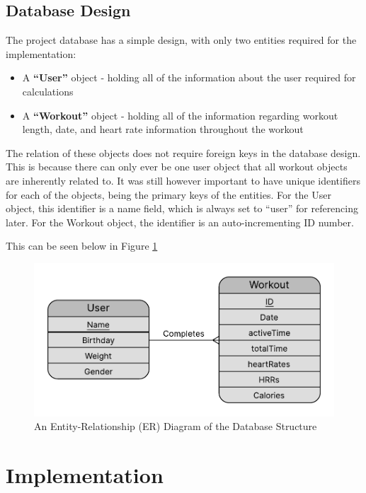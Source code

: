 \documentclass{l4proj}
\begin{document}
\section{Database Design}
\label{sec:databasedesign}

The project database has a simple design, with only two entities required for the implementation:

\begin{itemize}
    \item A \textbf{“User”} object - holding all of the information about the user required for calculations
    \item A \textbf{“Workout”} object - holding all of the information regarding workout length, date, and heart rate information throughout the workout
\end{itemize}

The relation of these objects does not require foreign keys in the database design. This is because there can only ever be one user object that all workout objects are inherently related to. It was still however important to have unique identifiers for each of the objects, being the primary keys of the entities. For the User object, this identifier is a name field, which is always set to “user” for referencing later. For the Workout object, the identifier is an auto-incrementing ID number.

This can be seen below in Figure \ref{fig:erdiagram}

\begin{figure}[h]
    \centering
    \includegraphics[width=0.75\linewidth]{dissertation//dissImages/ERDiagram.pdf}
    \caption{An Entity-Relationship (ER) Diagram of the Database Structure}
    \label{fig:erdiagram}
\end{figure}

\chapter{Implementation}
\label{sec:implementation}
\end{document}
